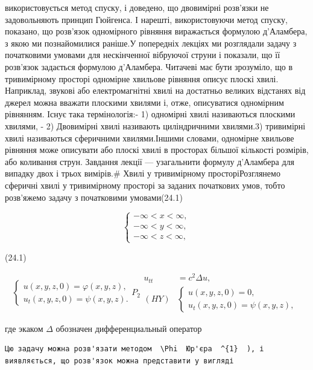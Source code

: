 \documentclass[
  ukrainian,
]{article}
\begin{document}
використовується метод спуску, і доведено, що двовимірні розв'язки не
задовольняють принцип Гюйгенса. І нарешті, використовуючи метод спуску,
показано, що розв'язок одномірного рівняння виражається формулою
д'Аламбера, з якою ми познайомилися раніше.У попередніх лекціях ми
розглядали задачу з початковими умовами для нескінченної вібруючої
струни і показали, що її розв'язок задається формулою д'Аламбера.
Читачеві має бути зрозуміло, що в тривимірному просторі одномірне
хвильове рівняння описує плоскі хвилі. Наприклад, звукові або
електромагнітні хвилі на достатньо великих відстанях від джерел можна
вважати плоскими хвилями і, отже, описуватися одномірним рівнянням.
Існує така термінологія:- 1) одномірні хвилі називаються плоскими
хвилями, - 2) Двовимірні хвилі називають циліндричними хвилями.3)
тривимірні хвилі називаються сферичними хвилями.Іншими словами,
одномірне хвильове рівняння може описувати або плоскі хвилі в просторах
більшої кількості розмірів, або коливання струн. Завдання лекції ---
узагальнити формулу д'Аламбера для випадку двох і трьох вимірів.\# Хвилі
у тривимірному просторіРозглянемо сферичні хвилі у тривимірному просторі
за заданих початкових умов, тобто розв'яжемо задачу з початковими
умовами(24.1)

\[
\begin{cases} -\infty < x < \infty, \\ -\infty < y < \infty, \\ -\infty < z < \infty, \end{cases}
\]

(24.1)

\[
\begin{cases} u(x, y, z, 0) = \varphi(x, y, z), \\ u_{t}(x, y, z, 0) = \psi(x, y, z). \end{cases}
P_{2}
\begin{aligned} u_{tt} &= c^2 \Delta u, \\ (HY) & \begin{cases} u(x, y, z, 0) = 0, \\ u_t(x, y, z, 0) = \psi(x, y, z), \end{cases} \end{aligned}
\]

где экаком \(\Delta\) обозначен дифференциальный оператор

\begin{verbatim}
Цю задачу можна розв'язати методом  \Phi  Юр'єра  ^{1}  ), і виявляється, що розв'язок можна представити у вигляді
\end{verbatim}
\end{document}
